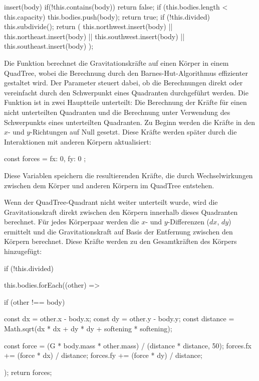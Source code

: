 \documentclass[a4paper,12pt,twoside]{article}
\begin{document}
\begin{javascript}
insert(body) {
    if(!this.contains(body)) return false;
    if (this.bodies.length < this.capacity) {
        this.bodies.push(body);
        return true;
    }
    if (!this.divided) this.subdivide();
    return (
        this.northwest.insert(body) ||
        this.northeast.insert(body) ||
        this.southwest.insert(body) ||
        this.southeast.insert(body)
    );
}
\end{javascript}


Die Funktion  berechnet die Gravitationskräfte auf einen Körper  in einem QuadTree, wobei die Berechnung durch den Barnes-Hut-Algorithmus effizienter gestaltet wird. Der Parameter  steuert dabei, ob die Berechnungen direkt oder vereinfacht durch den Schwerpunkt eines Quadranten durchgeführt werden. Die Funktion ist in zwei Hauptteile unterteilt: Die Berechnung der Kräfte für einen nicht unterteilten Quadranten und die Berechnung unter Verwendung des Schwerpunkts eines unterteilten Quadranten.
Zu Beginn werden die Kräfte in den \( x \)- und \( y \)-Richtungen auf Null gesetzt. Diese Kräfte werden später durch die Interaktionen mit anderen Körpern aktualisiert:

\begin{javascript}
const forces = { fx: 0, fy: 0 };
\end{javascript}

Diese Variablen speichern die resultierenden Kräfte, die durch Wechselwirkungen zwischen dem Körper und anderen Körpern im QuadTree entstehen.

Wenn der QuadTree-Quadrant nicht weiter unterteilt wurde, wird die Gravitationskraft direkt zwischen den Körpern innerhalb dieses Quadranten berechnet. Für jedes Körperpaar werden die \( x \)- und \( y \)-Differenzen (\( dx \), \( dy \)) ermittelt und die Gravitationskraft auf Basis der Entfernung zwischen den Körpern berechnet. Diese Kräfte werden zu den Gesamtkräften des Körpers hinzugefügt:

\begin{javascript}
if (!this.divided) {
    this.bodies.forEach((other) => {
        if (other !== body) {
            const dx = other.x - body.x;
            const dy = other.y - body.y;
            const distance = Math.sqrt(dx * dx + dy * dy + softening * softening);
            
            const force = (G * body.mass * other.mass) / (distance * distance, 50);
            forces.fx += (force * dx) / distance;
            forces.fy += (force * dy) / distance;
        }
    });
    return forces;
}
\end{javascript}
\end{document}
